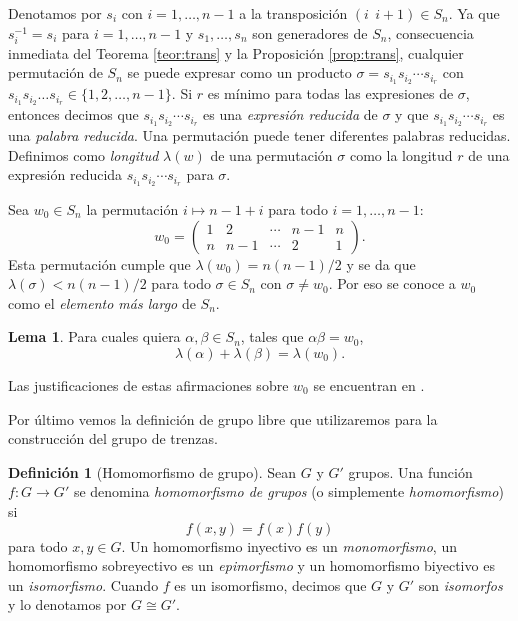 \documentclass[12pt]{book}
\theoremstyle{definition}
\newtheorem{defi}{Definición}[section]
\newtheorem{lema}{Lema}[section]
\begin{document}
Denotamos por $s_i$ con $i=1,\ldots,n-1$ a la transposición $(i\ \ i+1)\in S_n$. Ya que $s_i^{-1}= s_i$ para $i=1,\ldots,n-1$ y $s_1,\ldots,s_n$ son generadores de $S_n$, consecuencia inmediata del Teorema \ref{teor:trans} y la Proposición \ref{prop:trans}, cualquier permutación de $S_n$ se puede expresar como un producto $\sigma = s_{i_1}s_{i_2}\cdots s_{i_r}$ con $s_{i_1}s_{i_2}\ldots s_{i_r}\in\{1,2,\ldots,n-1\}$. Si $r$ es mínimo para todas las expresiones de $\sigma$, entonces decimos que $s_{i_1}s_{i_2}\cdots s_{i_r}$ es una \textit{expresión reducida} de $\sigma$ y que $s_{i_1}s_{i_2}\cdots s_{i_r}$ es una \textit{palabra reducida}. Una permutación puede tener diferentes palabras reducidas. Definimos como \textit{longitud} $\lambda(w)$ de una permutación $\sigma$ como la longitud $r$ de una expresión reducida $s_{i_1}s_{i_2}\cdots s_{i_r}$ para $\sigma$.

Sea $w_0\in S_n$ la permutación $i\mapsto n-1+i$ para todo $i = 1,\ldots,n-1$:
$$w_0 = 
\begin{pmatrix} 
1 & 2 & \cdots & n-1 & n \\
n & n-1 & \cdots & 2 & 1
\end{pmatrix}
.$$
Esta permutación cumple que $\lambda(w_0)=n(n-1)/2$ y se da que $\lambda(\sigma)<n(n-1)/2$ para todo $\sigma\in S_n$ con $\sigma\neq w_0$. Por eso se conoce a $w_0$ como el \textit{elemento más largo} de $S_n$.

\begin{lema}
Para cuales quiera $\alpha,\beta\in S_n$, tales que $\alpha\beta = w_0$,
$$\lambda(\alpha)+\lambda(\beta)=\lambda(w_0).$$
\label{lema:long_per}
\end{lema}
Las justificaciones de estas afirmaciones sobre $w_0$ se encuentran en \cite{br_gr}.

Por último vemos la definición de grupo libre que utilizaremos para la construcción del grupo de trenzas.

\begin{defi}[Homomorfismo de grupo]
Sean $G$ y $G'$ grupos. Una función $f:G\rightarrow G'$ se denomina \textit{homomorfismo de grupos} (o simplemente \textit{homomorfismo}) si
$$f(x,y)=f(x)f(y)$$
para todo $x,y\in G$. Un homomorfismo inyectivo es un \textit{monomorfismo}, un homomorfismo sobreyectivo es un \textit{epimorfismo} y un homomorfismo biyectivo es un \textit{isomorfismo}. Cuando $f$ es un isomorfismo, decimos que $G$ y $G'$ son \textit{isomorfos} y lo denotamos por $G\cong G'$.
\end{defi}
\end{document}

